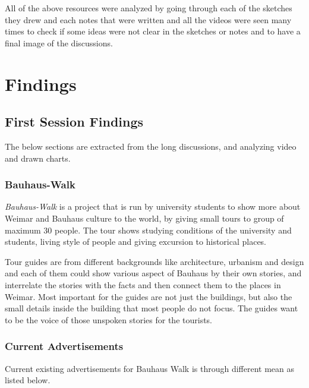 All of the above resources were analyzed by going through each of the sketches they drew and each notes that were written and all the videos were seen many times to check if some ideas were not clear in the sketches or notes and to have a final image of the discussions.


\newpage
\section{Findings}

\subsection {First Session Findings}
The below sections are extracted from the long discussions, and analyzing video and drawn charts.


\subsubsection{Bauhaus-Walk}
\emph{Bauhaus-Walk} is a project that is run by university students to show more about Weimar and Bauhaus culture to the world, by giving small tours to group of maximum 30 people. The tour shows studying conditions of the university and students, living style of people and giving excursion to historical places.

Tour guides are from different backgrounds like architecture, urbanism and design and each of them could show various aspect of Bauhaus by their own stories, and interrelate the stories with the facts and then connect them to the places in Weimar. Most important for the guides are not just the buildings, but also the small details inside the building that most people do not focus. The guides want to be the voice of those unspoken stories for the tourists.

\subsubsection{Current Advertisements}
Current existing advertisements for Bauhaus Walk is through different mean as listed below.

